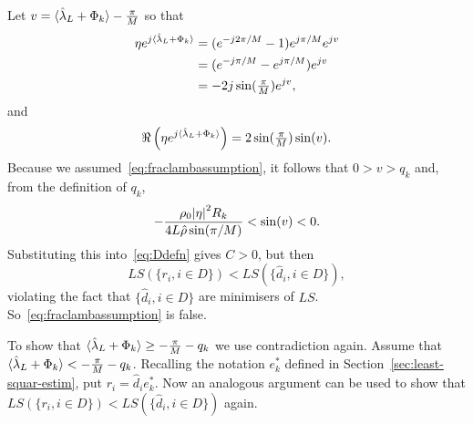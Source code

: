 \documentclass[journal]{IEEEtran}
\begin{document}
\begin{IEEEproof}
Let $v = \langle \hat{\lambda}_L + \Phi_k \rangle - \tfrac{\pi}{M}$ so that
\begin{align*}
\eta e^{j\langle \hat{\lambda}_L + \Phi_k \rangle} &= (e^{-j2\pi/M} - 1) e^{j \pi/M} e^{jv} \\
&= (e^{-j\pi/M} - e^{j\pi/M}) e^{jv} \\
&= -2 j \sin(\tfrac{\pi}{M}) e^{j v },
\end{align*}
and
\[
\Re\left( \eta e^{j\langle \hat{\lambda}_L + \Phi_k \rangle}\right) = 2 \sin(\tfrac{\pi}{M}) \sin(v).
\]
Because we assumed~\eqref{eq:fraclambassumption}, it follows that $0 > v > q_k$ and, from the definition of $q_k$,
\[
 -\frac{\rho_0 {\vert \eta \vert}^2 R_k}{4 L \hat{\rho} \sin(\pi/M)} <  \sin(v) < 0.
\]
Substituting this into~\eqref{eq:Ddefn} gives $C > 0$, but then 
\[
LS(\{r_i, i \in D\}) < LS(\{\hat{d}_i, i \in D\}),
\] 
violating the fact that $\{\hat{d}_i, i \in D\}$ are minimisers of $LS$.  So~\eqref{eq:fraclambassumption} is false.

To show that $\langle \hat{\lambda}_L + \Phi_k \rangle \geq -\frac{\pi}{M} - q_k$ we use contradiction again.  Assume that $\langle \hat{\lambda}_L + \Phi_k \rangle < -\frac{\pi}{M} - q_k$.  Recalling the notation $e_k^*$ defined in Section~\ref{sec:least-squar-estim}, put $r_i = \hat{d}_i e_k^*$.  Now an analogous argument can be used to show that $LS(\{r_i, i \in D\}) < LS(\{\hat{d}_i, i \in D\})$ again.
\end{IEEEproof}
\end{document}
